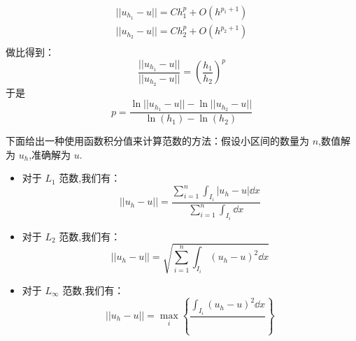 \documentclass{book}
\begin{document}
\begin{example}
\begin{example}{}{}
\begin{example}
\begin{example}
\begin{example}
\begin{example}
\begin{example}{}{}
\begin{example}
\begin{equation}
    \begin{aligned}
        || u_{h_1}-u || = Ch_1^p + O(h^{p_1+1}) \\
        || u_{h_2}-u || = Ch_2^p + O(h^{p_2+1}) \\
    \end{aligned}
\end{equation}
做比得到：
\begin{equation}
    \frac{|| u_{h_1}-u ||}{|| u_{h_2}-u ||} = \left(\frac{h_1}{h_2}\right)^p
\end{equation}
于是
\begin{equation}
    p = \frac{\ln|| u_{h_1}-u ||-\ln|| u_{h_2}-u ||}{\ln(h_1)-\ln(h_2)}
\end{equation}

下面给出一种使用函数积分值来计算范数的方法：假设小区间的数量为 $n$,数值解为 $u_h$,准确解为 $u$.
\begin{itemize}
    \item 对于 $L_1$ 范数,我们有：
          \begin{equation}
              || u_{h}-u || = \frac{\sum_{i=1}^{n}\int_{I_i}|u_{h}-u|\dd x }{\sum_{i=1}^{n}\int_{I_i}\dd x}
          \end{equation}

    \item 对于 $L_2$ 范数,我们有：
          \begin{equation}
              || u_{h}-u || = \sqrt{\sum_{i=1}^{n}\int_{I_i}\left(u_{h}-u\right)^2\dd x}
          \end{equation}
    \item 对于 $L_\infty$ 范数,我们有：
          \begin{equation}
              || u_{h}-u || = \max_i \left\{\frac{\int_{I_i}\left(u_{h}-u\right)^2\dd x}{} \right\}
          \end{equation}
\end{itemize}



\end{example}
\end{example}
\end{example}
\end{example}
\end{example}
\end{example}
\end{example}
\end{example}
\end{document}
